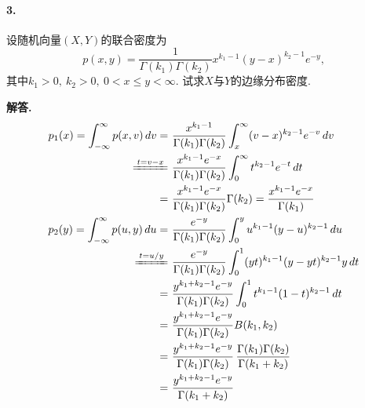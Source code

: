 \documentclass[12pt, a4paper, oneside]{ctexart}
\newenvironment{solution}{\par\noindent\textbf{解答. }}{\bigskip\par}
\begin{document}
\paragraph{3.}设随机向量$(X,Y)$的联合密度为\begin{equation*}
    p(x, y) = \frac{1}{\Gamma(k_1)\Gamma(k_2)}x^{k_1-1}(y-x)^{k_2-1}e^{-y},
\end{equation*}
其中$k_1>0,\ k_2 > 0,\ 0 < x\leqslant y < \infty$. 试求$X$与$Y$的边缘分布密度.
\begin{solution}
    \begin{equation*}
        \begin{aligned}
            p_1(x) = \int_{-\infty}^{\infty}p(x, v)\,dv =&\ \frac{x^{k_1-1}}{\Gamma(k_1)\Gamma(k_2)}\int_x^{\infty}(v-x)^{k_2-1}e^{-v}\,dv\\
            \xlongequal{t = v-x}&\ \frac{x^{k_1-1}e^{-x}}{\Gamma(k_1)\Gamma(k_2)}\int_0^{\infty}t^{k_2-1}e^{-t}\,dt\\
            =&\ \frac{x^{k_1-1}e^{-x}}{\Gamma(k_1)\Gamma(k_2)}\Gamma(k_2) = \frac{x^{k_1-1}e^{-x}}{\Gamma(k_1)}\\
            p_2(y) = \int_{-\infty}^{\infty}p(u, y)\,du =&\ \frac{e^{-y}}{\Gamma(k_1)\Gamma(k_2)}\int_0^yu^{k_1-1}(y-u)^{k_2-1}\,du\\
            \xlongequal{t = u/y}&\ \frac{e^{-y}}{\Gamma(k_1)\Gamma(k_2)}\int_0^1(yt)^{k_1-1}(y-yt)^{k_2-1}y\,dt\\
            =&\ \frac{y^{k_1+k_2-1}e^{-y}}{\Gamma(k_1)\Gamma(k_2)}\int_0^1t^{k_1-1}(1-t)^{k_2-1}\,dt\\
            =&\ \frac{y^{k_1+k_2-1}e^{-y}}{\Gamma(k_1)\Gamma(k_2)}B(k_1,k_2)\\
            =&\ \frac{y^{k_1+k_2-1}e^{-y}}{\Gamma(k_1)\Gamma(k_2)}\,\frac{\Gamma(k_1)\Gamma(k_2)}{\Gamma(k_1+k_2)}\\
            =&\ \frac{y^{k_1+k_2-1}e^{-y}}{\Gamma(k_1+k_2)}\\
        \end{aligned}
    \end{equation*}
\end{solution}
\end{document}
